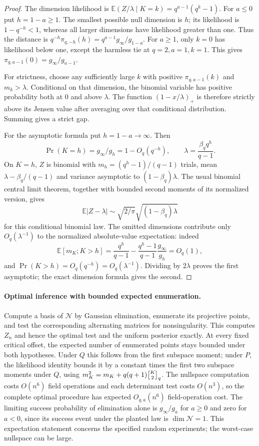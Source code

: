 \begin{proof}
The dimension likelihood is
$\mathbb E(Z/\lambda\mid K=k)=q^{a-1}(q^k-1)$.
For $a\le0$ put $h=1-a\ge1$. The smallest possible null dimension is $h$;
its likelihood is $1-q^{-h}<1$, whereas all larger dimensions have
likelihood greater than one. Thus the distance is
$q^{-h}\pi_{q,-h}(h)=q^{a-1}g_\infty/g_{1-a}$.
For $a\ge1$, only $k=0$ has likelihood below one, except the harmless tie
at $q=2,a=1,k=1$. This gives $\pi_{q,a-1}(0)=g_\infty/g_{a-1}$.

For strictness, choose any sufficiently large $k$ with positive
$\pi_{q,a-1}(k)$ and $m_k>\lambda$. Conditional on that dimension, the
binomial variable has positive probability both at $0$ and above
$\lambda$. The function $(1-x/\lambda)_+$ is therefore strictly above
its Jensen value after averaging over that conditional distribution.
Summing gives a strict gap.

For the asymptotic formula put $h=1-a\to\infty$. Then
\[
 \Pr(K=h)=g_\infty/g_h=1-O_q(q^{-h}),\qquad
 \lambda=\frac{\beta_qq^h}{q-1}.
\]
On $K=h$, $Z$ is binomial with $m_h=(q^h-1)/(q-1)$ trials, mean
$\lambda-\beta_q/(q-1)$ and variance asymptotic to
$(1-\beta_q)\lambda$. The usual binomial central limit theorem, together
with bounded second moments of its normalized version, gives
\[
 \mathbb E|Z-\lambda|\sim
 \sqrt{2/\pi}\sqrt{(1-\beta_q)\lambda}
\]
for this conditional binomial law. The omitted dimensions contribute
only $O_q(\lambda^{-1})$ to the normalized absolute-value expectation:
indeed
\[
 \mathbb E[m_K;K>h]
 =\frac{q^h}{q-1}-\frac{q^h-1}{q-1}\frac{g_\infty}{g_h}=O_q(1),
\]
and $\Pr(K>h)=O_q(q^{-h})=O_q(\lambda^{-1})$.
Dividing by $2\lambda$ proves the first asymptotic; the exact dimension
formula gives the second.
\end{proof}

\paragraph{Optimal inference with bounded expected enumeration.}
Compute a basis of $\mathcal N$ by Gaussian elimination, enumerate its
projective points, and test the corresponding alternating matrices for
nonsingularity. This computes $Z_n$ and hence the optimal test and the
uniform posterior exactly. At every fixed critical offset, the expected
number of enumerated points stays bounded under both hypotheses.
Under $Q$ this follows from the first subspace moment; under $P$, the
likelihood identity bounds it by a constant times the first two subspace
moments under $Q$, using $m_K^2=m_K+q(q+1)\qbinom K2$.
The nullspace computation costs $O(n^6)$ field
operations and each determinant test costs $O(n^3)$, so the complete
optimal procedure has expected $O_{q,a}(n^6)$ field-operation cost.
The limiting success probability of elimination alone is $g_\infty/g_a$
for $a\ge0$ and zero for $a<0$, since its success event under the planted
law is $\dim\mathcal N=1$. This expectation statement concerns the
specified random experiments; the worst-case nullspace can be large.

